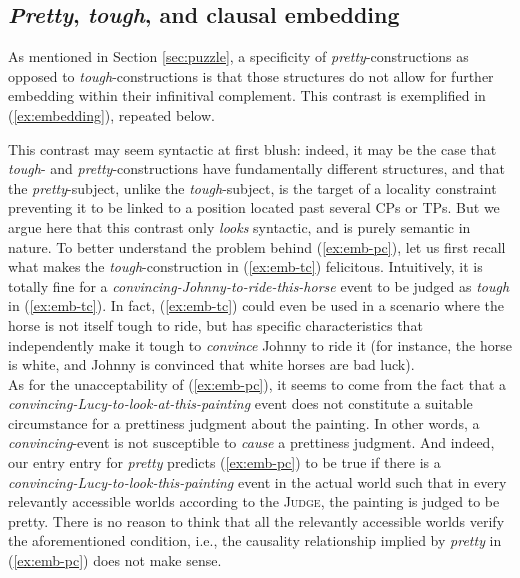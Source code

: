\documentclass[11pt]{article}
\begin{document}
\subsection{\textit{Pretty}, \textit{tough}, and clausal embedding}\label{sec:pretty-tough-embedding}
As mentioned in Section \ref{sec:puzzle}, a specificity of \textit{pretty}-constructions as opposed to \textit{tough}-constructions is that those structures do not allow for further embedding within their infinitival complement. This contrast is exemplified in (\ref{ex:embedding}), repeated below.
\begin{exe}
	\begin{xlist}
		\label{ex:pretty-embedding}
	\end{xlist}
\end{exe}
This contrast may seem syntactic at first blush: indeed, it may be the case that \textit{tough}- and \textit{pretty}-constructions have fundamentally different structures, and that the \textit{pretty}-subject, unlike the \textit{tough}-subject, is the target of a locality constraint preventing it to be linked to a position located past several CPs or TPs. But we argue here that this contrast only \textit{looks} syntactic, and is purely semantic in nature. To better understand the problem behind (\ref{ex:emb-pc}), let us first recall what makes the \textit{tough}-construction in (\ref{ex:emb-tc}) felicitous. Intuitively, it is totally fine for a \textit{convincing-Johnny-to-ride-this-horse} event to be judged as \textit{tough} in (\ref{ex:emb-tc}). In fact, (\ref{ex:emb-tc}) could even be used in a scenario where the horse is not itself tough to ride, but has specific characteristics that independently make it tough to \textit{convince} Johnny to ride it (for instance, the horse is white, and Johnny is convinced that white horses are bad luck).\\

As for the unacceptability of (\ref{ex:emb-pc}), it seems to come from the fact that a \textit{convincing-Lucy-to-look-at-this-painting} event does not constitute a suitable circumstance for a prettiness judgment about the painting. In other words, a \textit{convincing}-event is not susceptible to \textit{cause} a prettiness judgment. And indeed, our entry entry for \textit{pretty} predicts (\ref{ex:emb-pc}) to be true if there is a \textit{convincing-Lucy-to-look-this-painting} event in the actual world such that in every relevantly accessible worlds according to the \textsc{Judge}, the painting is judged to be pretty. There is no reason to think that all the relevantly accessible worlds verify the aforementioned condition, i.e., the causality relationship implied by \textit{pretty} in (\ref{ex:emb-pc}) does not make sense.\\
\end{document}
